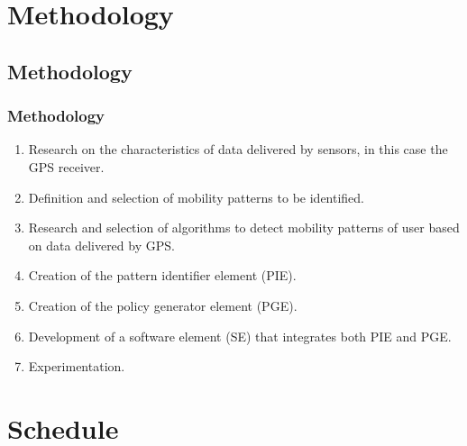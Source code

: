 \documentclass[compress,9pt,xcolor={dvipsnames,table}]{beamer}
\begin{document}
\section{Methodology}
\subsection{Methodology}
\begin{frame}\frametitle{Methodology}
\begin{enumerate}
  \item Research on the characteristics of data delivered by sensors, in this case the GPS receiver.
  \item Definition and selection of mobility patterns to be identified.
  \item Research and selection of algorithms to detect mobility patterns of user based on data delivered by GPS.
  \item Creation of the pattern identifier element (PIE).
  \item Creation of the policy generator element (PGE).
  \item Development of a software element (SE) that integrates both PIE and PGE.
  \item Experimentation.
\end{enumerate}
\end{frame}


\section{Schedule}
\end{document}
